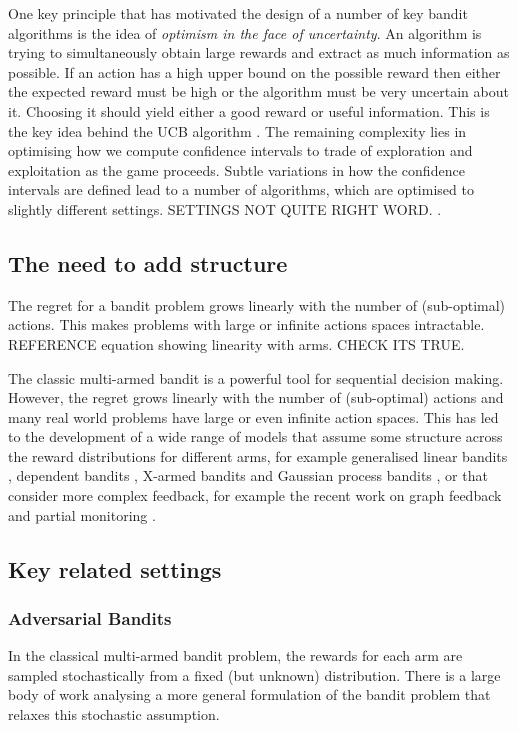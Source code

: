 \documentclass[11pt,a4paper,oneside]{book}
\theoremstyle{plain}
\theoremstyle{definition}
\begin{document}
One key principle that has motivated the design of a number  of key bandit algorithms is the idea of \emph{optimism in the face of uncertainty}. An algorithm is trying to simultaneously obtain large rewards and extract as much information as possible. If an action has a high upper bound on the possible reward then either the expected reward must be high or the algorithm must be very uncertain about it. Choosing it should yield either a good reward or useful information. This is the key idea behind the UCB algorithm \citep{xxx}. The remaining complexity lies in optimising how we compute confidence intervals to trade of exploration and exploitation as the game proceeds. Subtle variations in how the confidence intervals are defined lead to a number of algorithms, which are optimised to slightly different settings. SETTINGS NOT QUITE RIGHT WORD. \citep{xxx}.


\subsection{The need to add structure}
The regret for a bandit problem grows linearly with the number of (sub-optimal) actions. This makes problems with large or infinite actions spaces intractable. REFERENCE equation showing linearity with arms. CHECK ITS TRUE. 

The classic multi-armed bandit is a powerful tool for sequential decision making. However, the regret grows linearly with the number of (sub-optimal) actions and many real world problems have large or even infinite action spaces. This has led to the development of a wide range of models that assume some structure across the reward distributions for different arms, for example generalised linear bandits \cite{filippi2010parametric}, dependent bandits \cite{Pandey2007}, X-armed bandits \cite{Bubeck2010} and Gaussian process bandits \cite{srinivas2009gaussian}, or that consider more complex feedback, for example the recent work on graph feedback \cite{Mannor2011,Lelarge2012,Alon2013,Buccapatnam2014,Kocak2014,Alon2015} and partial monitoring \cite{Piccolboni2001,Bartok2014}. 


\subsection{Key related settings}

\subsubsection{Adversarial Bandits}
In the classical multi-armed bandit problem, the rewards for each arm are sampled stochastically from a fixed (but unknown) distribution. There is a large body of work analysing a more general formulation of the bandit problem that relaxes this stochastic assumption. 
\end{document}

